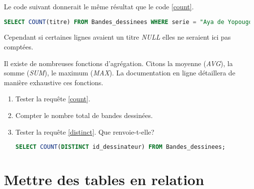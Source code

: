 \documentclass[a4paper,11pt]{article}
\begin{document}
\begin{Form}
\begin{aretenir}[]
Le code suivant donnerait le même résultat que le code \ref{count}.
\begin{lstlisting}[language=SQL]
SELECT COUNT(titre) FROM Bandes_dessinees WHERE serie = "Aya de Yopougon";
\end{lstlisting}
Cependant si certaines lignes avaient un titre \emph{NULL} elles ne seraient ici pas comptées.
\end{aretenir}
Il existe de nombreuses fonctions d'agrégation. Citons la moyenne (\emph{AVG}), la somme (\emph{SUM}), le maximum (\emph{MAX}). La documentation en ligne détaillera de manière exhaustive ces fonctions.
\begin{activite}
\begin{enumerate}
\item Tester la requête \ref{count}.
\item Compter le nombre total de bandes dessinées.
\item Tester la requête \ref{distinct}. Que renvoie-t-elle?
\begin{center}
\begin{lstlisting}[language=SQL]
SELECT COUNT(DISTINCT id_dessinateur) FROM Bandes_dessinees;
\end{lstlisting}
\label{distinct}
\end{center}
\end{enumerate}
\end{activite}
\section{Mettre des tables en relation}

\end{Form}
\end{document}
